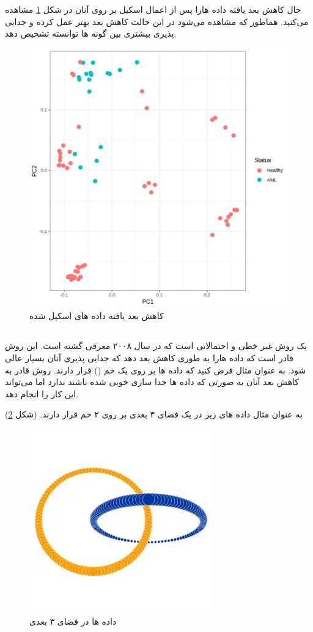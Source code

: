 \documentclass{article}
\begin{document}
حال کاهش بعد یافته داده هارا پس از اعمال اسکیل بر روی آنان در شکل \ref{fig:pca6}
مشاهده می‌کنید.
هماطور که مشاهده می‌شود در این حالت کاهش بعد بهتر عمل کرده و جدایی پذیری بیشتری بین گونه ها توانسته تشخیص دهد.
\begin{figure}[h!]
	\centering
	\includegraphics[width=0.5\columnwidth]{figs/pca6.png}
	\caption{ کاهش بعد یافته داده های اسکیل شده}
	\label{fig:pca6}
\end{figure}
\subsection{}
یک روش غیر خطی و احتمالاتی است که در سال ۲۰۰۸ معرفی گشته است.
این روش قادر است که داده هارا به طوری کاهش بعد دهد که جدایی پذیری آنان بسیار  عالی شود.
به عنوان مثال فرض کنید که داده ها بر روی یک خم ()
قرار دارند. روش 
قادر به کاهش بعد آنان به صورتی که داده ها جدا سازی خوبی شده باشند ندارد اما 
می‌تواند این کار را انجام دهد.

به عنوان مثال داده های زیر در یک فضای ۳ بعدی بر روی ۲ خم قرار دارند. (شکل \ref{fig:tsne})

\begin{figure}[h!]
	\centering
	\includegraphics[width=0.4\columnwidth]{figs/tsne.png}
	\caption{داده ها در فضای ۳ بعدی}
	\label{fig:tsne}
\end{figure}
\end{document}
